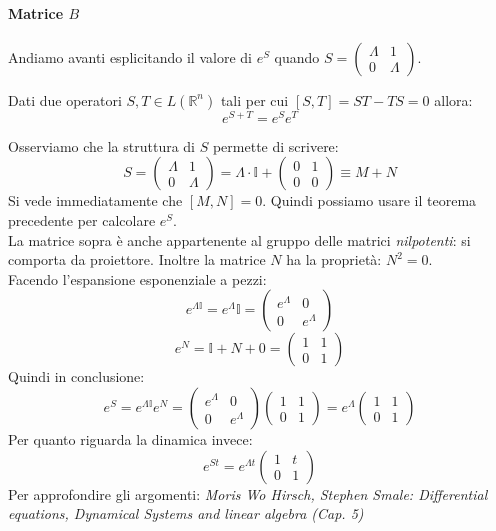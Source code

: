 \paragraph{Matrice $B$}%
Andiamo avanti esplicitando il valore di $e^S$ quando $S = \begin{pmatrix} \Lambda  & 1 \\ 0 & \Lambda \end{pmatrix} $.
\begin{thm}
    Dati due operatori $S, T \in L(\mathbb{R}^n)$ tali per cui $\left[S,T\right] = ST-TS=0$ allora:
    \[
        e^{S+T}=e^S e^T
    \] 
\end{thm}
\noindent
Osserviamo che la struttura di $S$ permette di scrivere:
\[
    S = \begin{pmatrix} \Lambda  & 1 \\ 0 & \Lambda \end{pmatrix} = 
    \Lambda  \cdot \mathbb{I} + \begin{pmatrix} 0 & 1 \\ 0 & 0 \end{pmatrix} \equiv M + N
\] 
Si vede immediatamente che $\left[M,N\right]=0$. Quindi possiamo usare il teorema precedente per calcolare $e^S$. \\
La matrice sopra è anche appartenente al gruppo delle matrici \textit{nilpotenti}: si comporta da proiettore. Inoltre la matrice $N$ ha la proprietà: $N^2 = 0$.\\
Facendo l'espansione esponenziale a pezzi:
\[
    e^{\Lambda\mathbb{I}}=e^{\Lambda}\mathbb{I} = \begin{pmatrix} e^\Lambda  & 0 \\ 0 & e^{\Lambda} \end{pmatrix} 
\] 
\[
    e^{N}= \mathbb{I} + N + 0 = \begin{pmatrix} 1 & 1 \\ 0 & 1 \end{pmatrix} 
\] 
Quindi in conclusione:
\[
    e^{S} = e^{\Lambda\mathbb{I}}e^N = \begin{pmatrix} e^\Lambda  & 0 \\ 0 & e^{\Lambda} \end{pmatrix} \begin{pmatrix} 1 & 1 \\ 0 & 1\end{pmatrix} =
    e^\Lambda  \begin{pmatrix} 1 & 1 \\ 0 & 1 \end{pmatrix} 
\] 
Per quanto riguarda la dinamica invece:
\[
    e^{St}=e^{\Lambda t}\begin{pmatrix} 1 & t \\ 0 & 1 \end{pmatrix} 
\] 
Per approfondire gli argomenti: \textit{Moris Wo Hirsch, Stephen Smale: Differential equations, Dynamical Systems and linear algebra (Cap. 5)}
